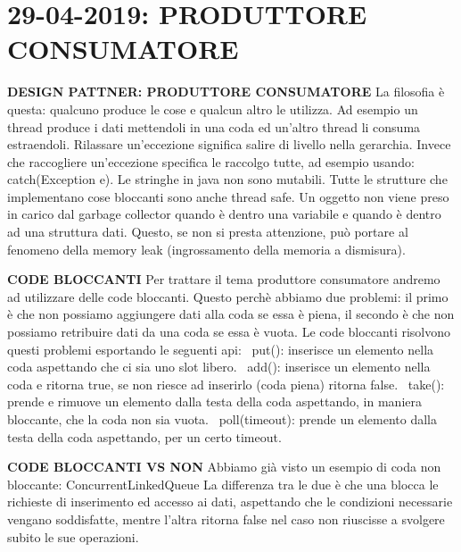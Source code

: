 

\newpage
\section{29-04-2019: PRODUTTORE CONSUMATORE}

\noindent \textbf{DESIGN PATTNER: PRODUTTORE CONSUMATORE} \newline
La filosofia è questa: qualcuno produce le cose e qualcun altro le utilizza. Ad esempio un thread produce i dati mettendoli in una coda ed un'altro thread li consuma estraendoli. \newline
Rilassare un'eccezione significa salire di livello nella gerarchia. Invece che raccogliere un'eccezione specifica le raccolgo tutte, ad esempio usando: catch(Exception e). \newline
Le stringhe in java non sono mutabili. \newline
Tutte le strutture che implementano cose bloccanti sono anche thread safe. \newline
Un oggetto non viene preso in carico dal garbage collector quando è dentro una variabile e quando è dentro ad una struttura dati. Questo, se non si presta attenzione, può portare al fenomeno della memory leak (ingrossamento della memoria a dismisura). \newline

\noindent \textbf{CODE BLOCCANTI} \newline
Per trattare il tema produttore consumatore andremo ad utilizzare delle code bloccanti. Questo perchè abbiamo due problemi: il primo è che non possiamo aggiungere dati alla coda se essa è piena, il secondo è che non possiamo retribuire dati da una coda se essa è vuota. Le code bloccanti risolvono questi problemi esportando le seguenti api: \newline
\textbullet\ put(): inserisce un elemento nella coda aspettando che ci sia uno slot libero. \newline
\textbullet\ add(): inserisce un elemento nella coda e ritorna true, se non riesce ad inserirlo (coda piena) ritorna false. \newline
\textbullet\ take(): prende e rimuove un elemento dalla testa della coda aspettando, in maniera bloccante, che la coda non sia vuota. \newline
\textbullet\ poll(timeout): prende un elemento dalla testa della coda aspettando, per un certo timeout.\newline

\noindent \textbf{CODE BLOCCANTI VS NON } \newline
Abbiamo già visto un esempio di coda non bloccante: ConcurrentLinkedQueue \newline
La differenza tra le due è che una blocca le richieste di inserimento ed accesso ai dati, aspettando che le condizioni necessarie vengano soddisfatte, mentre l'altra ritorna false nel caso non riuscisse a svolgere subito le sue operazioni.\newline

